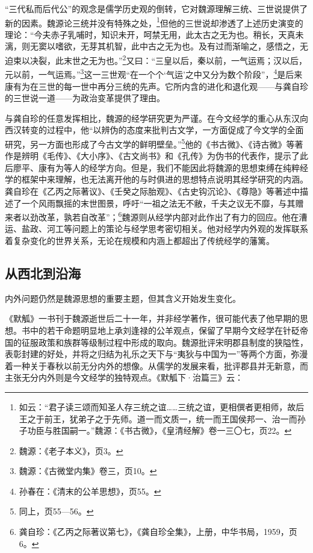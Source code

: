\documentclass[a4paper, 12pt, openright]{ctexbook}
\begin{document}
“三代私而后代公”的观念是儒学历史观的倒转，它对魏源理解三统、三世说提供了新的因素。魏源论三统并没有特殊之处，\footnote{如云：“君子读三颂而知圣人存三统之谊……三统之谊，更相僎者更相师，故后王之于前王，犹弟子之于先师。道一而文质一，统一而王国侯邦一、治一而孙子功臣与胜国嗣一。”魏源：《书古微》，《皇清经解》卷一三〇七，页22。}但他的三世说却渗透了上述历史演变的理论：“今夫赤子乳哺时，知识未开，呵禁无用，此太古之无为也。稍长，天真未漓，则无窦以嗜欲，无芽其机智，此中古之无为也。及有过而渐喻之，感悟之，无迫束以决裂，此末世之无为也。”\footnote{魏源：《老子本义》，页3。}又曰：“三皇以后，秦以前，一气运焉；汉以后，元以前，一气运焉。”\footnote{魏源：《古微堂内集》卷三，页10。}这一三世观“在一个个‘气运’之中又分为数个阶段”，\footnote{孙春在：《清末的公羊思想》，页55。}是后来康有为在三世的每一世中再分三统的先声。它所内含的进化和退化观——与龚自珍的三世说一道——为政治变革提供了理由。

与龚自珍的任意发挥相比，魏源的经学研究更为严谨。在今文经学的重心从东汉向西汉转变的过程中，他“以辨伪的态度来批判古文学，一方面促成了今文学的全面研究，另一方面也形成了今古文学的鲜明壁垒。”\footnote{同上，页55—56。}他的《书古微》、《诗古微》等著作是辨明《毛传》、《大小序》、《古文尚书》和《孔传》为伪书的代表作，提示了此后廖平、康有为等人的经学方向。但是，我们不能因此将魏源的思想束缚在纯粹经学的框架中来理解，也无法离开他的与时俱进的思想特点说明其经学研究的内涵。龚自珍在《乙丙之际著议》、《壬癸之际胎观》、《古史钩沉论》、《尊隐》等著述中描述了一个风雨飘摇的末世图景，呼吁“一祖之法无不敝，千夫之议无不靡，与其赠来者以劲改革，孰若自改革”；\footnote{龚自珍：《乙丙之际著议第七》，《龚自珍全集》，上册，中华书局，1959，页6。}魏源则从经学内部对此作出了有力的回应。他在漕运、盐政、河工等问题上的策论与经学思考密切相关。他对经学内外观的发挥联系着复杂变化的世界关系，无论在规模和内涵上都超出了传统经学的藩篱。

\subsection{从西北到沿海}

内外问题仍然是魏源思想的重要主题，但其含义开始发生变化。

《默觚》一书刊于魏源逝世后二十一年，并非经学著作，很可能代表了他早期的思想。书中的若干命题明显地上承刘逢禄的公羊观点，保留了早期今文经学在针砭帝国的征服政策和族群等级制过程中形成的取向。魏源批评宋明郡县制度的狭隘性，表彰封建的好处，并将之归结为礼乐之天下与“夷狄与中国为一”等两个方面，弥漫着一种关于春秋以前无分内外的想像。从儒学的发展来看，批评郡县并无新意，而主张无分内外则是今文经学的独特观点。《默觚下·治篇三》云：
\end{document}
